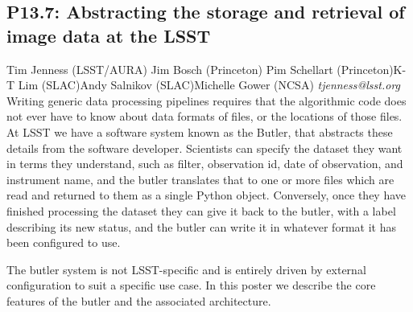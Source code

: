 \documentclass{report}
\begin{document}
\subsection*{P13.7: Abstracting the storage and retrieval of image data at the LSST}
\bigskip
Tim Jenness (LSST/AURA) \newline Jim Bosch (Princeton) \newline  Pim Schellart (Princeton)\newline  K-T Lim (SLAC)\newline Andy Salnikov (SLAC)\newline  Michelle Gower (NCSA)\newline\newline
{\it tjenness@lsst.org}\newline
\newline\newline
Writing generic data processing pipelines requires that the algorithmic code does not ever have to know about data formats of files, or the locations of those files.  At LSST we have a software system known as the Butler, that abstracts these details from the software developer.  Scientists can specify the dataset they want in terms they understand, such as filter, observation id, date of observation, and instrument name, and the butler translates that to one or more files which are read and returned to them as a single Python object. Conversely, once they have finished processing the dataset they can give it back to the butler, with a label describing its new status, and the butler can write it in whatever format it has been configured to use.

The butler system is not LSST-specific and is entirely driven by external configuration to suit a specific use case. In this poster we describe the core features of the butler and the associated architecture.\newline
\newpage
\end{document}
